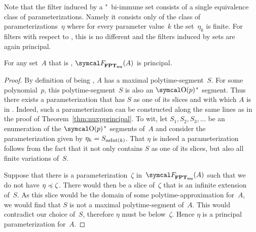 Note that the filter induced by a "~bi-immune set consists of a single equivalence class of parameterizations.
Namely it consists only of the class of parameterizations~$\eta$ where for every parameter value~$k$ the set~$\eta_k$ is finite.
For filters with respect to , this is no different and the filters induced by  sets are again principal.
\begin{theorem}
\label{thm:nufptprincipal}%
  For any set~$A$ that is , $\calF_\clnu{FPT}(A)$ is principal.
\end{theorem}
\begin{proof}
  By definition of being , $A$ has a maximal polytime-segment~$S$.
  For some polynomial~$p$, this polytime-segment~$S$ is also an $\bigO(p)$"~segment.
  Thus there exists a parameterization that has $S$ as one of its slices and with which $A$ is in .
  Indeed, such a parameterization can be constructed along the same lines as in the proof of Theorem~\ref{thm:nuxpprincipal}.
  To wit, let $S_1, S_2, S_3, \ldots$ be an enumeration of the $\bigO(p)$"~segments of~$A$ and consider the parameterization given by $\eta_k = S_{\operatorname{asInt}(k)}$.
  That $\eta$ is indeed a parameterization follows from the fact that it not only contains $S$ as one of its slices, but also all finite variations of~$S$.

  Suppose that there is a parameterization~$\zeta$ in~$\calF_\clnu{FPT}(A)$ such that we do not have $\eta \preccurlyeq \zeta$.
  There would then be a slice of~$\zeta$ that is an infinite extension of~$S$.
  As this slice would be the domain of some polytime-approximation for~$A$, we would find that $S$ is not a maximal polytime-segment of~$A$.
  This would contradict our choice of~$S$, therefore $\eta$ must be below~$\zeta$.
  Hence $\eta$ is a principal parameterization for~$A$.
\end{proof}
%

